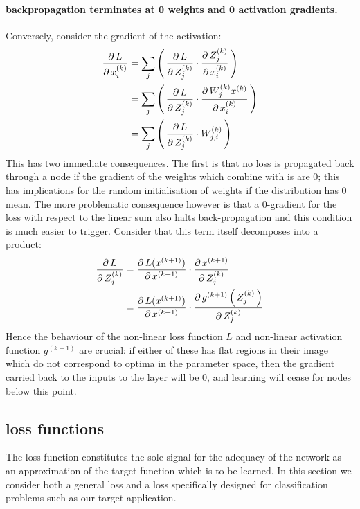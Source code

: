 \documentclass[msc]{infthesis}
\newcommand{\weightedsum}[2][]{Z_{#1}^{(#2)}}
\newcommand{\weights}[2][]{W_{#1}^{(#2)}}
\newcommand{\activation}[2][]{x_{#1}^{(#2)}}
\newcommand{\nonlinearity}[1]{g^{(#1)}}
\newcommand{\of}[1]{\left(\,{#1}\,\right)}
\begin{document}
\paragraph*{backpropagation terminates at 0 weights and 0 activation gradients.}
\label{sec:classification:2-2-1-1}
Conversely, consider the gradient of the activation:
%
\begin{align}
    \derivative[L]{ \activation[i]{k} }
    &=
      \sum_{j}\of{
      \derivative[L]{ \weightedsum[j]{k} }
      \cdot
      \derivative[{ \weightedsum[j]{k} }]{ \activation[i]{k} }
      }
    \\
    &=
      \sum_{j}\of{
      \derivative[L]{ \weightedsum[j]{k} }
      \cdot
      \derivative[{ \weights[j]{k} \activation{k} }]{ \activation[i]{k} }
      }
    \\
    &=
      \sum_{j}\of{
      \derivative[L]{ \weightedsum[j]{k} }
      \cdot
      \weights[j,i]{k}
      }
\end{align}
%
This has two immediate consequences.  The first is that no loss is propagated back through a
node if the gradient of the weights which combine with is are 0; this has implications for the
random initialisation of weights if the distribution has 0 mean.  The more problematic consequence
however is that a 0-gradient for the loss with respect to the linear sum also halts back-propagation
and this condition is much easier to trigger.  Consider that this term itself decomposes into a
product:
\begin{align}
  \derivative[L]{ \weightedsum[j]{k} }
  &=
    \derivative[ L(\activation{k+1}) ]{ \activation{k+1} }
    \cdot
    \derivative[ \activation{k+1} ]{ \weightedsum[j]{k} }
    \\
  &=
    \derivative[ L(\activation{k+1}) ]{ \activation{k+1} }
    \cdot
    \derivative[ \nonlinearity{k+1} \of{ \weightedsum[j]{k} }]{ \weightedsum[j]{k} }
\end{align}
Hence the behaviour of the non-linear loss function \(L\) and non-linear activation function
\(\nonlinearity{k+1}\) are crucial: if either of these has flat regions in their image which
do not correspond to optima in the parameter space, then the gradient carried back to the inputs
to the layer will be 0, and learning will cease for nodes below this point.





\subsection{loss functions}
\label{sec:classification:2-3}
The loss function constitutes the sole signal for the adequacy of the network as an approximation
of the target function which is to be learned.  In this section we consider both a general loss and
a loss specifically designed for classification problems such as our target application.
\end{document}
